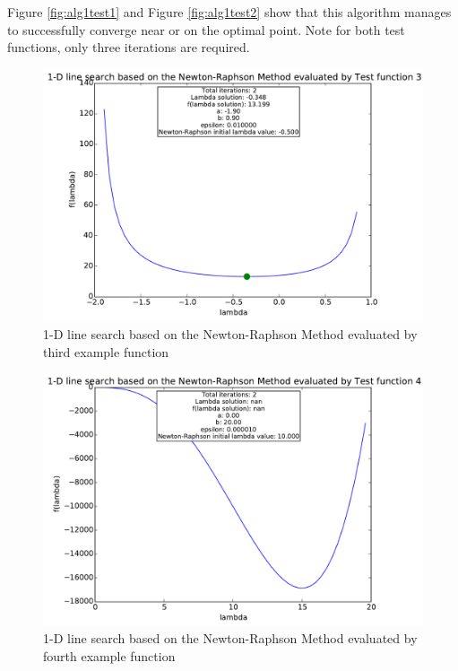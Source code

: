 \documentclass[a4paper,10pt]{article}
\begin{document}
Figure \ref{fig:alg1test1} and Figure \ref{fig:alg1test2} show that this algorithm manages to successfully converge near or on the optimal point. Note for both test functions, only three iterations are required.

\newpage
\begin{figure}[h]
\centering
 \includegraphics[scale=0.55]{./graphs/algorithm1/x_in_middel/testFunction3.pdf} 
 \caption{1-D line search based on the Newton-Raphson Method evaluated by third example function}
 \label{fig:alg1test3}
\end{figure}

\begin{figure}[h]
\centering
 \includegraphics[scale=0.55]{./graphs/algorithm1/x_in_middel/testFunction4.pdf} 
 \caption{1-D line search based on the Newton-Raphson Method evaluated by fourth example function}
 \label{fig:alg1test4}
\end{figure}
\end{document}
